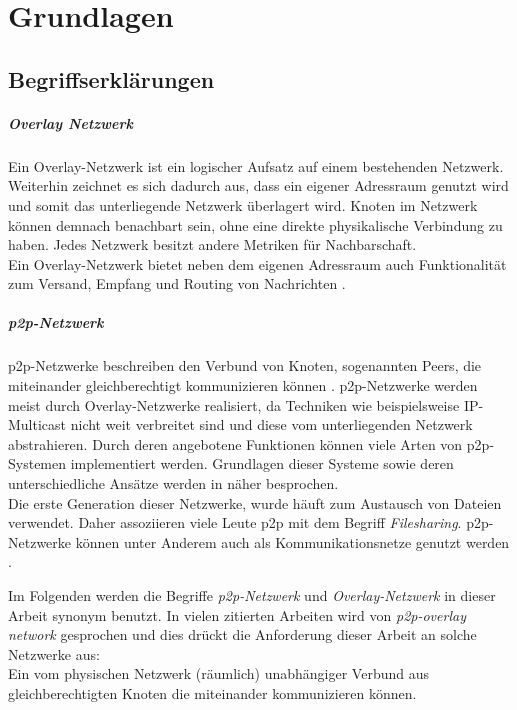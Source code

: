 \chapter{Grundlagen}
\label{chap:grundlagen}

\section{Begriffserklärungen}


\paragraph{Overlay Netzwerk} Ein Overlay-Netzwerk ist ein logischer Aufsatz auf einem bestehenden Netzwerk. Weiterhin zeichnet es sich dadurch aus, dass ein eigener Adressraum genutzt wird und somit das unterliegende Netzwerk überlagert wird. Knoten im Netzwerk können demnach benachbart sein, ohne eine direkte physikalische Verbindung zu haben. Jedes Netzwerk besitzt andere Metriken für Nachbarschaft.\\
Ein Overlay-Netzwerk bietet neben dem eigenen Adressraum auch Funktionalität zum Versand, Empfang und Routing von Nachrichten \cite{Tannenbaum2003}. 

\paragraph{\ac{p2p}-Netzwerk} p2p-Netzwerke beschreiben den Verbund von Knoten, sogenannten Peers, die miteinander gleichberechtigt kommunizieren können \cite{Steinmetz2005}. p2p-Netzwerke werden meist durch Overlay-Netzwerke realisiert, da Techniken wie beispielsweise IP-Multicast \cite{Deering1990Multicast} nicht weit verbreitet sind und diese vom unterliegenden Netzwerk abstrahieren. Durch deren angebotene Funktionen können viele Arten von p2p-Systemen implementiert werden. Grundlagen dieser Systeme sowie deren unterschiedliche Ansätze werden in  näher besprochen.\\
Die erste Generation dieser Netzwerke, wurde häuft zum Austausch von Dateien verwendet. Daher assoziieren viele Leute \ac{p2p} mit dem Begriff \emph{Filesharing}. p2p-Netzwerke können unter Anderem auch als Kommunikationsnetze genutzt werden \cite{Darlagiannis2006Peertopeer}. 

Im Folgenden werden die Begriffe \emph{p2p-Netzwerk} und \emph{Overlay-Netzwerk} in dieser Arbeit synonym benutzt. In vielen zitierten Arbeiten wird von \emph{p2p-overlay network} gesprochen und dies drückt die Anforderung dieser Arbeit an solche Netzwerke aus:\\
Ein vom physischen Netzwerk (räumlich) unabhängiger Verbund aus gleichberechtigten Knoten die miteinander kommunizieren können.










